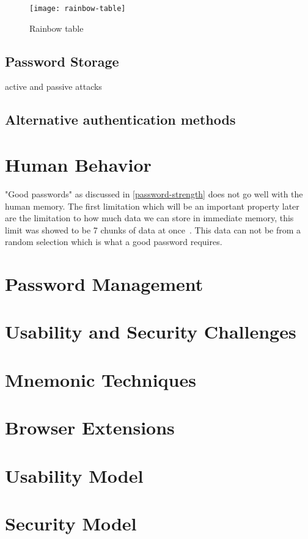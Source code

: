 \begin{figure}[h]
    \texttt{[image: rainbow-table]}
    \caption{Rainbow table}
    \label{rainbow-table}
\end{figure}

\subsection{Password Storage}
active and passive attacks  
\subsection{Alternative authentication methods}

\section{Human Behavior}
"Good passwords" as discussed in \ref{password-strength} does not go well with the human memory. The first limitation which will be an important property later are the limitation to how much data we can store in immediate memory, this limit was showed to be 7 chunks of data at once~\cite{magic-seven_miller}. This data can not be from a random selection which is what a good password requires.   

\section{Password Management}

\section{Usability and Security Challenges}

\section{Mnemonic Techniques}

\section{Browser Extensions}

\section{Usability Model}

\section{Security Model}





